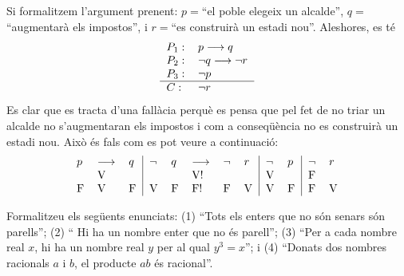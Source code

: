\begin{solucio}
Si formalitzem l'argument prenent: $p=$\textquotedblleft el poble elegeix un
alcalde\textquotedblright, $q=$\textquotedblleft augmentar\`{a} els
impostos\textquotedblright, i $r=$\textquotedblleft es construir\`{a} un
estadi nou\textquotedblright. Aleshores, es t\'{e}%
\[%
\begin{tabular}
[c]{ll}%
$P_{1}:$ & $p\longrightarrow q$\\
$P_{2}:$ & $\lnot q\longrightarrow\lnot r$\\
$P_{3}:$ & $\lnot p$\\\hline
$C:$ & $\lnot r$%
\end{tabular}
\]
Es clar que es tracta d'una fal\textperiodcentered l\`{a}cia perqu\`{e} es
pensa que pel fet de no triar un alcalde no s'augmentaran els impostos i com a
conseq\"{u}\`{e}ncia no es construir\`{a} un estadi nou. Aix\`{o} \'{e}s fals com
es pot veure a continuaci\'{o}:%
\[%
\begin{tabular}
[c]{lll|lllll|ll|ll}%
$p$ & $\longrightarrow$ & $q$ & $\lnot$ & $q$ & $\longrightarrow$ & $\lnot$ &
$r$ & $\lnot$ & $p$ & $\lnot$ & $r$\\
& V &  &  &  & V! &  &  & V &  & F & \\
F & V & F & V & F & F! & F & V & V & F & F & V
\end{tabular}
\]

\end{solucio}

\begin{exercici}
Formalitzeu els seg\"{u}ents enunciats: (1) \textquotedblleft Tots els enters
que no s\'{o}n senars s\'{o}n parells\textquotedblright; (2) \textquotedblleft
Hi ha un nombre enter que no \'{e}s parell\textquotedblright; (3)
\textquotedblleft Per a cada nombre real $x$, hi ha un nombre real $y$ per al
qual $y^{3}=x$\textquotedblright; i (4) \textquotedblleft Donats dos nombres
racionals $a$ i $b$, el producte $ab$ \'{e}s racional\textquotedblright.
\end{exercici}

